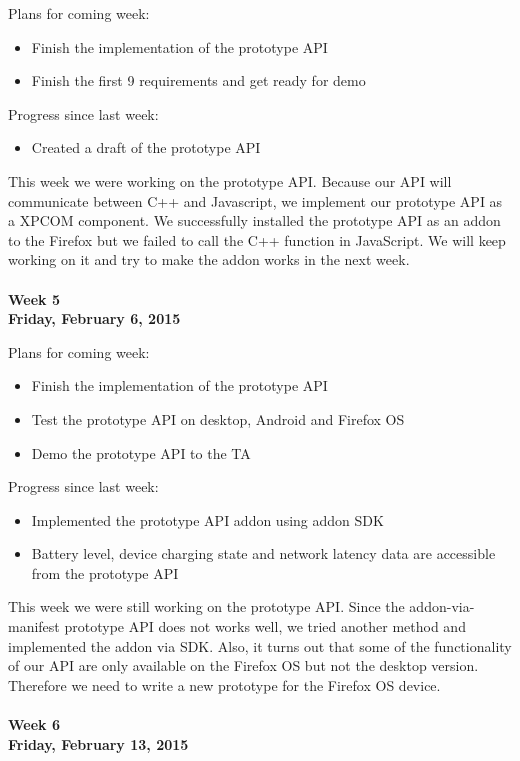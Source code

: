 \noindent Plans for coming week:
\begin{itemize}
\item Finish the implementation of the prototype API
\item Finish the first 9 requirements and get ready for demo
\end{itemize}

\noindent Progress since last week:
\begin{itemize}
\item Created a draft of the prototype API
\end{itemize}

\noindent This week we were working on the prototype API. Because our API will communicate between C++ and Javascript, we implement our prototype API as a XPCOM component. We successfully installed the prototype API as an addon to the Firefox but we failed to call the C++ function in JavaScript. We will keep working on it and try to make the addon works in the next week. \\
\\
\textbf{Week 5\\Friday, February 6, 2015\\}

\noindent Plans for coming week:
\begin{itemize}
\item Finish the implementation of the prototype API
\item Test the prototype API on desktop, Android and Firefox OS
\item Demo the prototype API to the TA
\end{itemize}

\noindent Progress since last week:
\begin{itemize}
\item Implemented the prototype API addon using addon SDK
\item Battery level, device charging state and network latency data are accessible from the prototype API
\end{itemize}

\noindent This week we were still working on the prototype API. Since the addon-via-manifest prototype API does not works well, we tried another method and implemented the addon via SDK. Also, it turns out that some of the functionality of our API are only available on the Firefox OS but not the desktop version. Therefore we need to write a new prototype for the Firefox OS device. \\
\\
\textbf{Week 6\\Friday, February 13, 2015\\}

